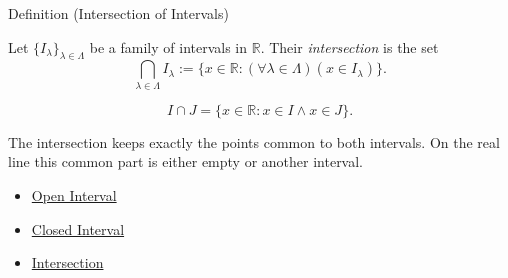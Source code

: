 \begin{definitionbox}{Definition (Intersection of Intervals)}
\begin{definition}
\label{def:intersection-of-intervals}
Let $\{I_\lambda\}_{\lambda\in\Lambda}$ be a family of intervals in
$\mathbb{R}$.  Their \emph{intersection} is the set
\[
  \bigcap_{\lambda\in\Lambda}I_\lambda
  :=
  \{x\in\mathbb{R}:(\forall\lambda\in\Lambda)(x\in I_\lambda)\}.
\]
\end{definition}
\end{definitionbox}

\begin{remark*}
\[
I\cap J=\{x\in\mathbb{R}:x\in I\land x\in J\}.
\]
\end{remark*}

\begin{remark*}[Interpretation]
The intersection keeps exactly the points common to both intervals. On the
real line this common part is either empty or another interval.
\end{remark*}

\begin{dependencies}
\begin{itemize}
  \item \hyperref[def:open-interval]{Open Interval}
  \item \hyperref[def:closed-interval]{Closed Interval}
  \item \hyperref[def:intersection]{Intersection}
\end{itemize}
\end{dependencies}
